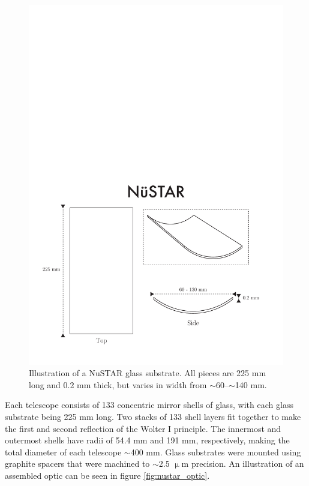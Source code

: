 \begin{figure}[!htp] %
	\centering	\includegraphics[width=0.7\linewidth]{figures/introduction/nustar_glass.pdf}
	\caption{\footnotesize Illustration of a NuSTAR glass substrate. All pieces are 225 mm long and 0.2 mm thick, but varies in width from $\sim$60--$\sim$140 mm. }
	\label{fig:nustar_glass}
\end{figure}

Each telescope consists of 133 concentric mirror shells of glass, with each glass substrate being 225 mm long. Two stacks of 133 shell layers fit together to make the first and second reflection of the Wolter I principle. The innermost and outermost shells have radii of 54.4 mm and 191 mm, respectively, making the total diameter of each telescope $\sim$400 mm. Glass substrates were mounted using graphite spacers that were machined to $\sim$2.5 $\upmu$m precision. An illustration of an assembled optic can be seen in figure \ref{fig:nustar_optic}.

